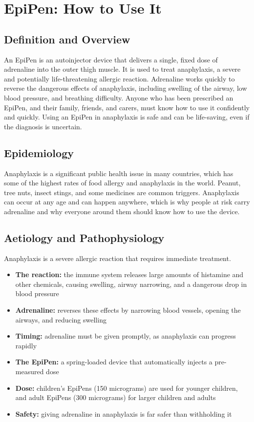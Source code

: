 \chapter{EpiPen: How to Use It}

\section*{Definition and Overview}
An EpiPen is an autoinjector device that delivers a single, fixed dose of adrenaline into the outer thigh muscle. It is used to treat anaphylaxis, a severe and potentially life-threatening allergic reaction. Adrenaline works quickly to reverse the dangerous effects of anaphylaxis, including swelling of the airway, low blood pressure, and breathing difficulty. Anyone who has been prescribed an EpiPen, and their family, friends, and carers, must know how to use it confidently and quickly. Using an EpiPen in anaphylaxis is safe and can be life-saving, even if the diagnosis is uncertain.

\section*{Epidemiology}
Anaphylaxis is a significant public health issue in many countries, which has some of the highest rates of food allergy and anaphylaxis in the world. Peanut, tree nuts, insect stings, and some medicines are common triggers. Anaphylaxis can occur at any age and can happen anywhere, which is why people at risk carry adrenaline and why everyone around them should know how to use the device.

\section*{Aetiology and Pathophysiology}
Anaphylaxis is a severe allergic reaction that requires immediate treatment.
\begin{itemize}
    \item \textbf{The reaction:} the immune system releases large amounts of histamine and other chemicals, causing swelling, airway narrowing, and a dangerous drop in blood pressure
    \item \textbf{Adrenaline:} reverses these effects by narrowing blood vessels, opening the airways, and reducing swelling
    \item \textbf{Timing:} adrenaline must be given promptly, as anaphylaxis can progress rapidly
    \item \textbf{The EpiPen:} a spring-loaded device that automatically injects a pre-measured dose
    \item \textbf{Dose:} children's EpiPens (150 micrograms) are used for younger children, and adult EpiPens (300 micrograms) for larger children and adults
    \item \textbf{Safety:} giving adrenaline in anaphylaxis is far safer than withholding it
\end{itemize}

